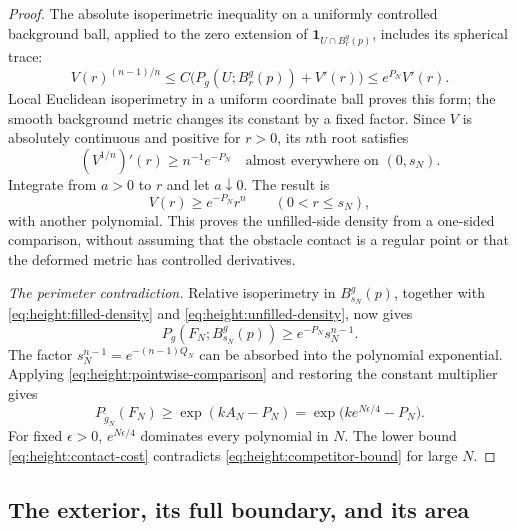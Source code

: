 \begin{proof}
The absolute isoperimetric inequality on a uniformly controlled
background ball, applied to the zero extension of
$\mathbf1_{U\cap B^g_r(p)}$, includes its spherical trace:
\[
 V(r)^{(n-1)/n}
 \le C\bigl(P_g(U;B^g_r(p))+V'(r)\bigr)
 \le e^{P_N}V'(r).
\]
Local Euclidean isoperimetry in a uniform coordinate ball proves this
form; the smooth background metric changes its constant by a fixed
factor.  Since $V$ is absolutely continuous and positive for $r>0$,
its $n$th root satisfies
\[
 (V^{1/n})'(r)\ge n^{-1}e^{-P_N}
 \quad\text{almost everywhere on }(0,s_N).
\]
Integrate from $a>0$ to $r$ and let $a\downarrow0$.  The result is
\begin{equation}\label{eq:height:unfilled-density}
 V(r)\ge e^{-P_N}r^n\qquad(0<r\le s_N),
\end{equation}
with another polynomial.  This proves the unfilled-side density from
a one-sided comparison, without assuming that the obstacle contact is
a regular point or that the deformed metric has controlled derivatives.

\medskip\noindent\emph{The perimeter contradiction.}
Relative isoperimetry in $B^g_{s_N}(p)$, together with \eqref{eq:height:filled-density} and \eqref{eq:height:unfilled-density},
now gives
\[
 P_g(F_N;B^g_{s_N}(p))\ge e^{-P_N}s_N^{n-1}.
\]
The factor $s_N^{n-1}=e^{-(n-1)Q_N}$ can be absorbed into the polynomial
exponential.  Applying \eqref{eq:height:pointwise-comparison}
and restoring the constant multiplier gives
\begin{equation}\label{eq:height:contact-cost}
 P_{\widetilde g_N}(F_N)
 \ge\exp(kA_N-P_N)
 =\exp\bigl(k e^{N\epsilon/4}-P_N\bigr).
\end{equation}
For fixed $\epsilon>0$, $e^{N\epsilon/4}$ dominates every polynomial
in $N$.  The lower bound \eqref{eq:height:contact-cost} contradicts
\eqref{eq:height:competitor-bound} for large $N$.
\end{proof}



\subsection{The exterior, its full boundary, and its area}

